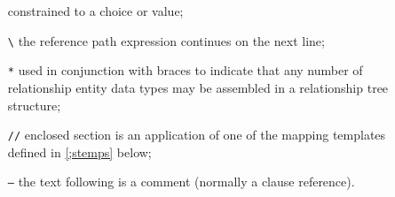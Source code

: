 \begin{description}
\begin{itemize}
    constrained to a choice or value;
\item[\texttt{\textbackslash}]  the reference path expression continues on
    the next line;
\item[\texttt{*}] used in conjunction with braces to indicate that
     any number of relationship entity data types may be assembled
     in a relationship tree structure;
\ifmaptemplate
\item[\texttt{//}] enclosed section is an application of one of the
                mapping templates defined in \ref{;stemps} below;
\fi
\item[\texttt{--}] the text following is a comment
                (normally a clause reference).
\end{itemize}

\end{description}

\endinput
